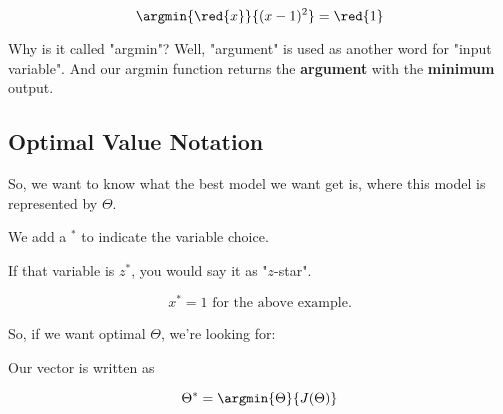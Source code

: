     \miniex
    
    \begin{equation}
        \argmin{\red{x}}{ (x-1)^2 } = \red{1}
    \end{equation}
    
    Why is it called "argmin"? Well, "argument" is used as another word for "input variable". And our argmin function returns the \textbf{argument} with the \textbf{minimum} output.
    
\subsection*{Optimal Value Notation}
    
    So, we want to know what the best model we want get is, where this model is represented by $\Theta$.\\
    
    \begin{notation}
        We add a  $^*$ to indicate the  variable choice.
        
        If that variable is $z^*$, you would say it as "$z$-star".
    \end{notation}
    
    \miniex 
    
    \begin{equation}
        x^* = 1 \text{ for the above example.}
    \end{equation}
    
    So, if we want optimal $\Theta$, we're looking for:\\
    
    \begin{kequation}
    
        Our  vector is written as 
        
        \begin{equation*}
            \Theta^* = \argmin{ \Theta  }{  J(\Theta)  }
        \end{equation*}
    \end{kequation}
        